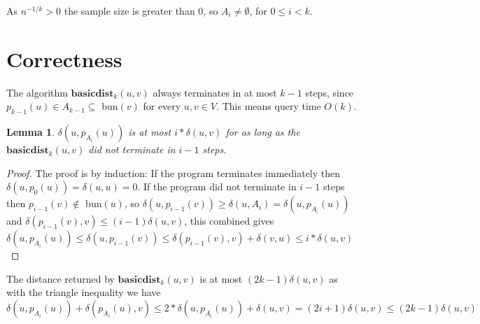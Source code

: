 \documentclass[shortabstract, lic, english]{iithesis}
\theoremstyle{definition} \newtheorem{definition}{Definition}[chapter]
\theoremstyle{remark} \newtheorem{remark}[definition]{Observation}
\theoremstyle{plain} \newtheorem{theorem}[definition]{Theorem}
\theoremstyle{plain} \newtheorem{lemma}[definition]{Lemma}
\theoremstyle{plain} \newtheorem{conjecture}[definition]{Conjecture}
\begin{document}
\noindent{}

As $n^{-1/k} > 0$ the sample size is greater than $0$, so $A_{i} \neq \emptyset$, for $0 \leq i < k$.

\section{Correctness}

The algorithm $\mathbf{basicdist}_k(u, v)$ always terminates in at most $k-1$ steps,
since $p_{k-1}(u) \in A_{k-1} \subseteq $ bun$(v)$ for every $u,v \in V$.
This means query time $O(k)$.

\begin{lemma}
$\delta(u, p_{A_i}(u))$ is at most $i*\delta(u,v)$
for as long as the $\mathbf{basicdist}_k(u, v)$ did not terminate in $i-1$ steps.
\end{lemma}
\begin{proof} 
The proof is by induction:
\newline
If the program terminates immediately then $\delta(u, p_0(u)) = \delta(u, u) = 0$.
\newline
If the program did not terminate in $i-1$ steps then 
\newline
$p_{i-1}(v) \notin $ bun$(u)$, so
$\delta(u, p_{i-1}(v)) \geq \delta(u, A_{i}) = \delta(u, p_{A_i}(u))$ and
\newline
$\delta(p_{i-1}(v), v) \leq (i-1)\delta(u, v)$, this combined gives
\newline
$\delta(u, p_{A_i}(u)) \leq \delta(u, p_{i-1}(v)) \leq \delta(p_{i-1}(v), v) + \delta(v, u) \leq i*\delta(u, v)$
\end{proof}

The distance returned by $\mathbf{basicdist}_k(u, v)$ is at most $(2k - 1)\delta(u,v)$ as
with the triangle inequality we have \newline
$\delta(u,p_{A_i}(u)) + \delta( p_{A_i}(u), v) \leq 2*\delta(u,  p_{A_i}(u)) + \delta(u,v) = (2i + 1)\delta(u,v) \leq (2k - 1)\delta(u,v)$
\end{document}
